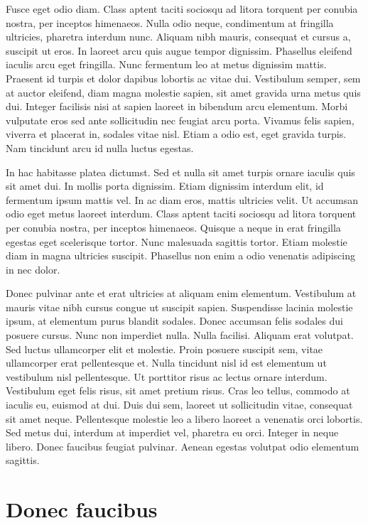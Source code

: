 \documentclass{EPUProjetDi}
\begin{document}
Fusce eget odio diam. Class aptent taciti sociosqu ad litora torquent per conubia nostra, per inceptos himenaeos. Nulla odio neque, condimentum at fringilla ultricies, pharetra interdum nunc. Aliquam nibh mauris, consequat et cursus a, suscipit ut eros. In laoreet arcu quis augue tempor dignissim. Phasellus eleifend iaculis arcu eget fringilla. Nunc fermentum leo at metus dignissim mattis. Praesent id turpis et dolor dapibus lobortis ac vitae dui. Vestibulum semper, sem at auctor eleifend, diam magna molestie sapien, sit amet gravida urna metus quis dui. Integer facilisis nisi at sapien laoreet in bibendum arcu elementum. Morbi vulputate eros sed ante sollicitudin nec feugiat arcu porta. Vivamus felis sapien, viverra et placerat in, sodales vitae nisl. Etiam a odio est, eget gravida turpis. Nam tincidunt arcu id nulla luctus egestas.


In hac habitasse platea dictumst. Sed et nulla sit amet turpis ornare iaculis quis sit amet dui. In mollis porta dignissim. Etiam dignissim interdum elit, id fermentum ipsum mattis vel. In ac diam eros, mattis ultricies velit. Ut accumsan odio eget metus laoreet interdum. Class aptent taciti sociosqu ad litora torquent per conubia nostra, per inceptos himenaeos. Quisque a neque in erat fringilla egestas eget scelerisque tortor. Nunc malesuada sagittis tortor. Etiam molestie diam in magna ultricies suscipit. Phasellus non enim a odio venenatis adipiscing in nec dolor.

Donec pulvinar ante et erat ultricies at aliquam enim elementum. Vestibulum at mauris vitae nibh cursus congue ut suscipit sapien. Suspendisse lacinia molestie ipsum, at elementum purus blandit sodales. Donec accumsan felis sodales dui posuere cursus. Nunc non imperdiet nulla. Nulla facilisi. Aliquam erat volutpat. Sed luctus ullamcorper elit et molestie. Proin posuere suscipit sem, vitae ullamcorper erat pellentesque et. Nulla tincidunt nisl id est elementum ut vestibulum nisl pellentesque. Ut porttitor risus ac lectus ornare interdum. Vestibulum eget felis risus, sit amet pretium risus. Cras leo tellus, commodo at iaculis eu, euismod at dui. Duis dui sem, laoreet ut sollicitudin vitae, consequat sit amet neque. Pellentesque molestie leo a libero laoreet a venenatis orci lobortis. Sed metus dui, interdum at imperdiet vel, pharetra eu orci. Integer in neque libero. Donec faucibus feugiat pulvinar. Aenean egestas volutpat odio elementum sagittis.

\section{Donec faucibus}
\end{document}
